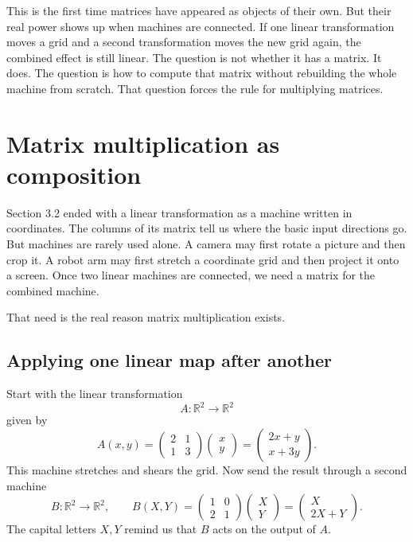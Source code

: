 This is the first time matrices have appeared as objects of their own.  But their real
power shows up when machines are connected.  If one linear transformation moves a
grid and a second transformation moves the new grid again, the combined effect is
still linear.  The question is not whether it has a matrix.  It does.  The question is how
to compute that matrix without rebuilding the whole machine from scratch.  That
question forces the rule for multiplying matrices.
\section{Matrix multiplication as composition}
\label{sec:3.3}

Section 3.2 ended with a linear transformation as a machine written in coordinates.
The columns of its matrix tell us where the basic input directions go.  But machines are
rarely used alone.  A camera may first rotate a picture and then crop it.  A robot arm may
first stretch a coordinate grid and then project it onto a screen.  Once two linear machines
are connected, we need a matrix for the combined machine.

That need is the real reason matrix multiplication exists.

\subsection{Applying one linear map after another}

Start with the linear transformation
\[
    A:\mathbb R^2\to\mathbb R^2
\]
given by
\[
    A(x,y)=
    \begin{pmatrix}
        2&1\\
        1&3
    \end{pmatrix}
    \begin{pmatrix}x\\y\end{pmatrix}
    =
    \begin{pmatrix}
        2x+y\\
        x+3y
    \end{pmatrix}.
\]
This machine stretches and shears the grid.  Now send the result through a second
machine
\[
    B:\mathbb R^2\to\mathbb R^2,
    \qquad
    B(X,Y)=
    \begin{pmatrix}
        1&0\\
        2&1
    \end{pmatrix}
    \begin{pmatrix}X\\Y\end{pmatrix}
    =
    \begin{pmatrix}
        X\\
        2X+Y
    \end{pmatrix}.
\]
The capital letters \(X,Y\) remind us that \(B\) acts on the output of \(A\).

